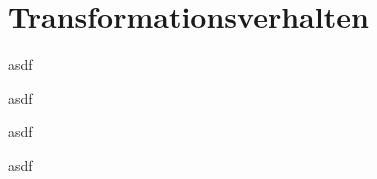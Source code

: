 \section{Transformationsverhalten}

asdf

\begin{bem}
asdf
\end{bem}

\begin{Prop}
asdf
\end{Prop}

\begin{Prop}
asdf
\end{Prop}


